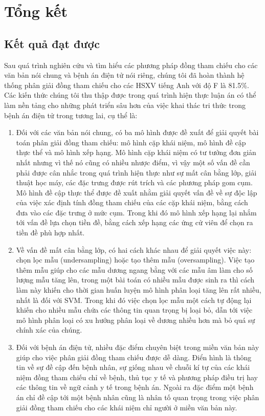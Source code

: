 \chapter{Tổng kết}

\section{Kết quả đạt được}
Sau quá trình nghiên cứu và tìm hiểu các phương pháp đồng tham chiếu cho các văn bản nói chung và bệnh án điện tử nói riêng, chúng tôi đã hoàn thành hệ thống phân giải đồng tham chiếu cho các HSXV tiếng Anh với độ F là 81.5\%. Các kiến thức chúng tôi thu thập được trong quá trình hiện thực luận án có thể làm nền tảng cho những phát triển sâu hơn của việc khai thác tri thức trong bệnh án điện tử trong tương lai, cụ thể là:
\begin{enumerate}
\item Đối với các văn bản nói chung, có ba mô hình được đề xuất để giải quyết bài toán phân giải đồng tham chiếu: mô hình cặp khái niệm, mô hình đề cập thực thể và mô hình xếp hạng. Mô hình cặp khái niệm có tư tưởng đơn giản nhất nhưng vì thế nó cũng có nhiều nhược điểm, vì vậy một số vấn đề cần phải được cân nhắc trong quá trình hiện thực như sự mất cân bằng lớp, giải thuật học máy, các đặc trưng được rút trích và các phương pháp gom cụm. Mô hình đề cập thực thể được đề xuất nhằm giải quyết vấn đề về sự độc lập của việc xác định tính đồng tham chiếu của các cặp khái niệm, bằng cách đưa vào các đặc trưng ở mức cụm. Trong khi đó mô hình xếp hạng lại nhắm tới vấn đề lựa chọn tiền đề, bằng cách xếp hạng các ứng cử viên để chọn ra tiền đề phù hợp nhất. 
\item Về vấn đề mất cân bằng lớp, có hai cách khác nhau để giải quyết việc này: chọn lọc mẫu (undersampling) hoặc tạo thêm mẫu (oversampling). Việc tạo thêm mẫu giúp cho các mẫu dương ngang bằng với các mẫu âm làm cho số lượng mẫu tăng lên, trong một bài toán có nhiều mẫu được sinh ra thì cách làm này khiến cho thời gian huấn luyện mô hình phân loại tăng lên rất nhiều, nhất là đối với SVM. Trong khi đó việc chọn lọc mẫu một cách tự động lại khiến cho nhiều mẫu chứa các thông tin quan trọng bị loại bỏ, dẫn tới việc mô hình phân loại có xu hướng phân loại về dương nhiều hơn mà bỏ quá sự chính xác của chúng.
\item Đối với bệnh án điện tử, nhiều đặc điểm chuyên biệt trong miền văn bản này giúp cho việc phân giải đồng tham chiếu được dễ dàng. Điển hình là thông tin về sự đề cập đến bệnh nhân, sự giống nhau về chuỗi kí tự của các khái niệm đồng tham chiếu chỉ về bệnh, thủ tục y tế và phương pháp điều trị hay các thông tin về ngữ cảnh y tế trong bệnh án. Ngoài ra đặc điểm một bệnh án chỉ đề cập tới một bệnh nhân cũng là nhân tố quan trọng trong việc phân giải đồng tham chiếu cho các khái niệm chỉ người ở miền văn bản này.
\end{enumerate}

